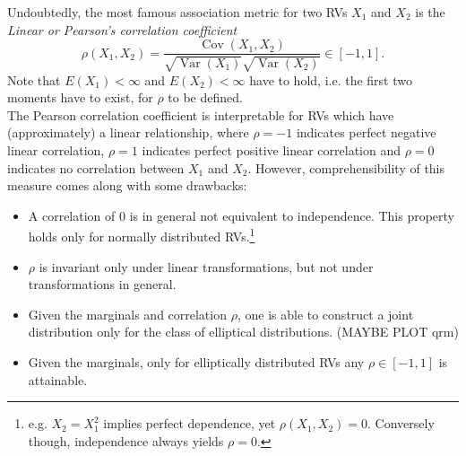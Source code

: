
Undoubtedly, the most famous association metric for two \acp{RV} $X_1$ and $X_2$ is the \textit{Linear or Pearson's correlation coefficient}
\begin{equation}
\rho\left(X_{1}, X_{2}\right)=
\frac{\operatorname{Cov}\left(X_{1}, X_{2}\right)}{\sqrt{\operatorname{Var} (X_{1})} \sqrt{\operatorname{Var} (X_{2})}}
\in [-1, 1].
\label{eq:pearsons_rho}
\end{equation}
Note that $E(X_1) < \infty$ and $E(X_2) < \infty$ have to hold, i.e. the first two moments have to exist, for $\rho$ to be defined.\\
The Pearson correlation coefficient is interpretable for \acp{RV} which have (approximately) a linear relationship, where $\rho = -1$ indicates perfect negative linear correlation, $\rho=1$ indicates perfect positive linear correlation and $\rho=0$ indicates no correlation between $X_1$ and $X_2$. However, comprehensibility of this measure comes along with some drawbacks:
\begin{itemize}
\item A correlation of $0$ is in general not equivalent to independence. This property holds only for normally distributed \acp{RV}.\footnote{e.g. $X_2 =X_1^2$ implies perfect dependence, yet $\rho(X_1,X_2) = 0$. Conversely though, independence always yields $\rho=0$.}
\item $\rho$ is invariant only under linear transformations, but not under transformations in general.
\item Given the marginals and correlation $\rho$, one is able to construct a joint distribution only for the class of elliptical distributions. (MAYBE PLOT qrm)
\item Given the marginals, only for elliptically distributed \acp{RV} any $\rho \in [-1,1]$ is attainable.
\end{itemize}








